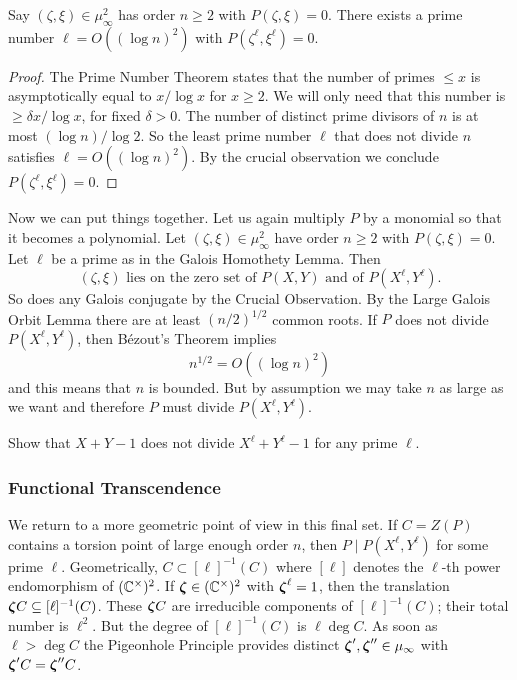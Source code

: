\begin{lemma}
  Say $(\zeta,\xi)\in \mu_\infty^2$ has order $n\ge 2$
  with $P(\zeta,\xi)=0$. There exists a prime number $\ell=O((\log
  n)^2)$ with $P(\zeta^\ell,\xi^\ell)=0$. 
\end{lemma}
\begin{proof}
  The Prime Number Theorem states that the number of primes $\le x$ is
  asymptotically equal to $x/\log x$ for $x\ge 2$.
  We will only need that this number
  is $\ge \delta x/\log x$, for fixed $\delta >0$. 
  The number of
  distinct prime divisors of $n$ is at most $(\log n)/\log 2$.
  So the least prime number $\ell$ that does not divide $n$ satisfies $\ell =
  O((\log n)^2)$. By the crucial observation we conclude
  $P(\zeta^\ell,\xi^\ell)=0$. 
\end{proof}

Now we can put things together. Let us again multiply $P$ by a
monomial so that it becomes a polynomial.
Let $(\zeta,\xi)\in \mu_\infty^2$ have order $n\ge 2$ with
$P(\zeta,\xi)=0$. Let $\ell$ be a prime as in the Galois Homothety
Lemma.
Then
\begin{equation}
  \label{eq:intersectionGm}
  (\zeta,\xi)\text{ lies on the zero set of $P(X,Y)$ and of 
    $P(X^{\ell},Y^{\ell})$}.
\end{equation}
So does any Galois
conjugate by the Crucial Observation.
By the Large Galois Orbit Lemma there are at least
$(n/2)^{1/2}$ common roots. If $P$ does not divide $P(X^\ell,Y^\ell)$,
then B\'ezout's Theorem implies
\begin{equation*}
  n^{1/2} = O((\log n)^2)
\end{equation*}
and this means that $n$ is bounded. But by assumption we may take $n$
as large as we want and therefore $P$ must divide $P(X^\ell,Y^\ell)$.

\begin{exercise}
  Show that $X+Y-1$ does not divide  $X^\ell + Y^\ell-1$ for any prime
  $\ell$. 
\end{exercise}

\subsubsection{Functional Transcendence}

We return to a more geometric point of view in this final set.
If $C=Z(P)$ contains a torsion point of large enough order $n$, then
$P \mid P(X^\ell,Y^\ell)$ for some prime $\ell$.
Geometrically, $C \subset [\ell]^{-1}(C)$ where $[\ell]$ denotes the $\ell$-th
power endomorphism of $({\mathbb{C}}^\times)^2$.
If ${\boldsymbol{\zeta}}\in ({\mathbb{C}}^\times)^2$ with ${\boldsymbol{\zeta}}^\ell=1$, then the
translation ${\boldsymbol{\zeta}} C\subseteq [\ell]^{-1}(C)$. These ${\boldsymbol{\zeta}} C$ are
irreducible components of $[\ell]^{-1}(C)$; their total number is
$\ell^2$. But the degree of $[\ell]^{-1}(C)$ is $\ell \deg C$. As soon
as $\ell > \deg C$ the Pigeonhole Principle provides distinct
${\boldsymbol{\zeta}}',{\boldsymbol{\zeta}}''\in \mu_\infty$ with ${\boldsymbol{\zeta}}' C = {\boldsymbol{\zeta}}''C$.

